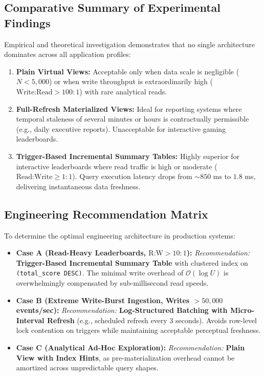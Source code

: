 \documentclass[11pt,a4paper]{report}
\begin{document}
\subsection{Comparative Summary of Experimental Findings}
Empirical and theoretical investigation demonstrates that no single architecture dominates across all application profiles:
\begin{enumerate}
    \item \textbf{Plain Virtual Views:} Acceptable only when data scale is negligible ($N < 5,000$) or when write throughput is extraordinarily high ($\text{Write:Read} > 100:1$) with rare analytical reads.
    \item \textbf{Full-Refresh Materialized Views:} Ideal for reporting systems where temporal staleness of several minutes or hours is contractually permissible (e.g., daily executive reports). Unacceptable for interactive gaming leaderboards.
    \item \textbf{Trigger-Based Incremental Summary Tables:} Highly superior for interactive leaderboards where read traffic is high or moderate ($\text{Read:Write} \ge 1:1$). Query execution latency drops from $\sim 850$ ms to $1.8$ ms, delivering instantaneous data freshness.
\end{enumerate}

\subsection{Engineering Recommendation Matrix}
To determine the optimal engineering architecture in production systems:
\begin{itemize}
    \item \textbf{Case A (Read-Heavy Leaderboards, $\text{R:W} > 10:1$):} \textit{Recommendation:} \textbf{Trigger-Based Incremental Summary Table} with clustered index on \texttt{(total\_score DESC)}. The minimal write overhead of $\mathcal{O}(\log U)$ is overwhelmingly compensated by sub-millisecond read speeds.
    \item \textbf{Case B (Extreme Write-Burst Ingestion, Writes $> 50,000$ events/sec):} \textit{Recommendation:} \textbf{Log-Structured Batching with Micro-Interval Refresh} (e.g., scheduled refresh every 3 seconds). Avoids row-level lock contention on triggers while maintaining acceptable perceptual freshness.
    \item \textbf{Case C (Analytical Ad-Hoc Exploration):} \textit{Recommendation:} \textbf{Plain View with Index Hints}, as pre-materialization overhead cannot be amortized across unpredictable query shapes.
\end{itemize}
\end{document}
